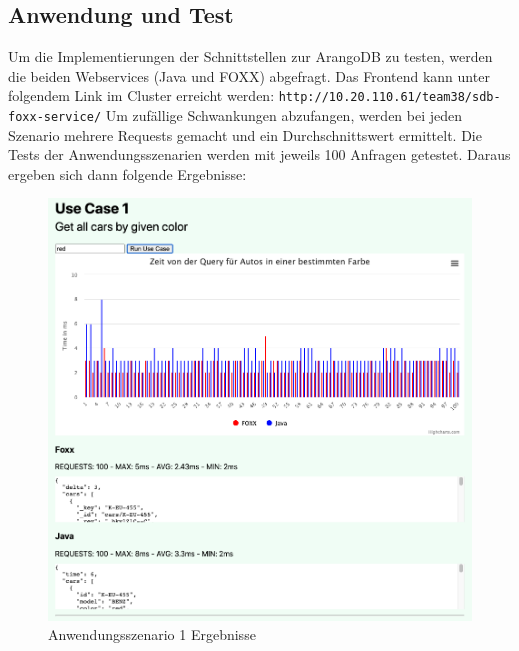 \subsection{Anwendung und Test}
Um die Implementierungen der Schnittstellen zur ArangoDB zu testen, werden die beiden Webservices (Java und FOXX) abgefragt. Das Frontend kann unter folgendem Link im Cluster erreicht werden: \texttt{http://10.20.110.61/team38/sdb-foxx-service/} \newline
Um zufällige Schwankungen abzufangen, werden bei jeden Szenario mehrere Requests gemacht und ein Durchschnittswert ermittelt. Die Tests der Anwendungsszenarien werden mit jeweils 100 Anfragen getestet. Daraus ergeben sich dann folgende Ergebnisse:
\begin{figure}[htbp] 
  	\centering
     \includegraphics[width=1\textwidth]{./images/UseCase1.png}
 	\caption{Anwendungsszenario 1 Ergebnisse}
  \label{fig:DataSchema}
\end{figure}

